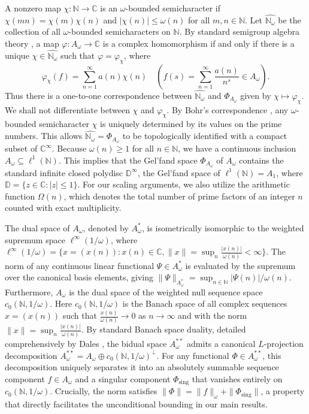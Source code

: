 \documentclass{amsart}
\theoremstyle{definition}
\theoremstyle{remark}
\numberwithin{equation}{section}
\begin{document}
A nonzero map $\chi:\mathbb N \to \mathbb C$ is an $\omega$-bounded semicharacter if $\chi(mn)=\chi(m)\chi(n)$ and $|\chi(n)|\leq \omega(n)$ for all $m, n \in \mathbb N$. Let $\widehat{\mathbb N_\omega}$ be the collection of all $\omega$-bounded semicharacters on $\mathbb N$. By standard semigroup algebra theory \cite{hewitt1956}, a map $\varphi:A_\omega\to \mathbb C$ is a complex homomorphism if and only if there is a unique $\chi \in \widehat{\mathbb N_\omega}$ such that $\varphi=\varphi_\chi$, where $$\varphi_\chi(f)=\sum_{n=1}^\infty a(n)\chi(n)\quad(f(s)=\sum_{n=1}^\infty \frac{a(n)}{n^s}\in A_\omega).$$ Thus there is a one-to-one correspondence between $\widehat{\mathbb N_\omega}$ and $\Phi_{A_\omega}$ given by $\chi\mapsto \varphi_\chi$. We shall not differentiate between $\chi$ and $\varphi_\chi$. By Bohr's correspondence \cite{bohr1913}, any $\omega$-bounded semicharacter $\chi$ is uniquely determined by its values on the prime numbers. This allows $\widehat{\mathbb N_\omega}=\Phi_{A_\omega}$ to be topologically identified with a compact subset of $\mathbb C^\infty$. Because $\omega(n) \geq 1$ for all $n \in \mathbb N$, we have a continuous inclusion $A_\omega \subseteq \ell^1(\mathbb N)$. This implies that the Gel'fand space $\Phi_{A_\omega}$ of $A_\omega$ contains the standard infinite closed polydisc $\mathbb D^\infty$, the Gel'fand space of $\ell^1(\mathbb N)=A_1$, where $\mathbb D=\{z\in \mathbb C:|z|\leq 1\}$. For our scaling arguments, we also utilize the arithmetic function $\Omega(n)$, which denotes the total number of prime factors of an integer $n$ counted with exact multiplicity.

The dual space of $A_\omega$, denoted by $A_\omega^\ast$, is isometrically isomorphic to the weighted supremum space $\ell^\infty(1/\omega)$, where $\ell^\infty(1/\omega)=\{x=(x(n)):x(n)\in \mathbb C, \|x\|=\sup_n\frac{|x(n)|}{\omega(n)}<\infty\}$. The norm of any continuous linear functional $\Psi \in A_\omega^\ast$ is evaluated by the supremum over the canonical basis elements, giving $\|\Psi\|_{A_\omega^\ast} = \sup_{n \in \mathbb N} |\Psi(n)| / \omega(n)$. Furthermore, $A_\omega$ is the dual space of the weighted null sequence space $c_0(\mathbb N, 1/\omega)$. Here $c_0(\mathbb N,1/\omega)$ is the Banach space of all complex sequences $x=(x(n))$ such that $\frac{x(n)}{\omega(n)}\to 0$ as $n\to \infty$ and with the norm $\|x\|=\sup_n\frac{|x(n)|}{\omega(n)}$. By standard Banach space duality, detailed comprehensively by Dales \cite{dales2000}, the bidual space $A_\omega^{\ast\ast}$ admits a canonical $L$-projection decomposition $A_\omega^{\ast\ast} = A_\omega \oplus c_0(\mathbb N, 1/\omega)^\perp$. For any functional $\Phi \in A_\omega^{\ast\ast}$, this decomposition uniquely separates it into an absolutely summable sequence component $f \in A_\omega$ and a singular component $\Phi_{\text{sing}}$ that vanishes entirely on $c_0(\mathbb N, 1/\omega)$. Crucially, the norm satisfies $\|\Phi\| = \|f\|_\omega + \|\Phi_{\text{sing}}\|$, a property that directly facilitates the unconditional bounding in our main results.
\end{document}
